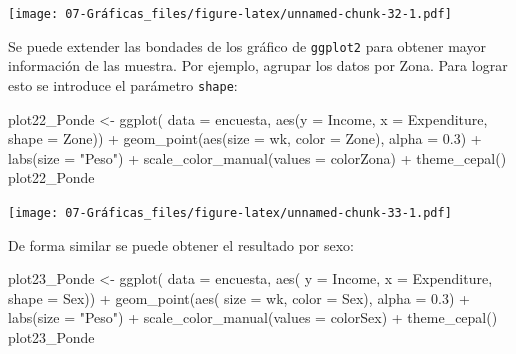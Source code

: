 \documentclass[
  12pt,
]{book}
\newenvironment{Shaded}{\begin{snugshade}}{\end{snugshade}}
\newcommand{\AttributeTok}[1]{\textcolor[rgb]{0.77,0.63,0.00}{#1}}
\newcommand{\FloatTok}[1]{\textcolor[rgb]{0.00,0.00,0.81}{#1}}
\newcommand{\FunctionTok}[1]{\textcolor[rgb]{0.00,0.00,0.00}{#1}}
\newcommand{\NormalTok}[1]{#1}
\newcommand{\OtherTok}[1]{\textcolor[rgb]{0.56,0.35,0.01}{#1}}
\newcommand{\SpecialCharTok}[1]{\textcolor[rgb]{0.00,0.00,0.00}{#1}}
\newcommand{\StringTok}[1]{\textcolor[rgb]{0.31,0.60,0.02}{#1}}
\begin{document}
\texttt{[image: 07-Gráficas\_files/figure-latex/unnamed-chunk-32-1.pdf]}

Se puede extender las bondades de los gráfico de \texttt{ggplot2} para obtener mayor información de las muestra. Por ejemplo, agrupar los datos por Zona. Para lograr esto se introduce el parámetro \texttt{shape}:

\begin{Shaded}
\begin{Highlighting}[]
\NormalTok{plot22\_Ponde }\OtherTok{\textless{}{-}} \FunctionTok{ggplot}\NormalTok{(}
  \AttributeTok{data =}\NormalTok{ encuesta,}
    \FunctionTok{aes}\NormalTok{(}\AttributeTok{y =}\NormalTok{ Income, }
        \AttributeTok{x =}\NormalTok{ Expenditure,}
        \AttributeTok{shape =}\NormalTok{ Zone)) }\SpecialCharTok{+} 
  \FunctionTok{geom\_point}\NormalTok{(}\FunctionTok{aes}\NormalTok{(}\AttributeTok{size =}\NormalTok{ wk, }\AttributeTok{color =}\NormalTok{ Zone), }\AttributeTok{alpha =} \FloatTok{0.3}\NormalTok{) }\SpecialCharTok{+}
  \FunctionTok{labs}\NormalTok{(}\AttributeTok{size =} \StringTok{"Peso"}\NormalTok{) }\SpecialCharTok{+} \FunctionTok{scale\_color\_manual}\NormalTok{(}\AttributeTok{values =}\NormalTok{ colorZona) }\SpecialCharTok{+}
  \FunctionTok{theme\_cepal}\NormalTok{()}
\NormalTok{plot22\_Ponde}
\end{Highlighting}
\end{Shaded}

\texttt{[image: 07-Gráficas\_files/figure-latex/unnamed-chunk-33-1.pdf]}

De forma similar se puede obtener el resultado por sexo:

\begin{Shaded}
\begin{Highlighting}[]
\NormalTok{plot23\_Ponde }\OtherTok{\textless{}{-}} \FunctionTok{ggplot}\NormalTok{(}
  \AttributeTok{data =}\NormalTok{ encuesta,}
    \FunctionTok{aes}\NormalTok{(}
      \AttributeTok{y =}\NormalTok{ Income,}
      \AttributeTok{x =}\NormalTok{ Expenditure,}
      \AttributeTok{shape =}\NormalTok{ Sex)) }\SpecialCharTok{+}
  \FunctionTok{geom\_point}\NormalTok{(}\FunctionTok{aes}\NormalTok{(}
    \AttributeTok{size =}\NormalTok{ wk,}
    \AttributeTok{color =}\NormalTok{ Sex),}
  \AttributeTok{alpha =} \FloatTok{0.3}\NormalTok{) }\SpecialCharTok{+}
  \FunctionTok{labs}\NormalTok{(}\AttributeTok{size =} \StringTok{"Peso"}\NormalTok{) }\SpecialCharTok{+}
  \FunctionTok{scale\_color\_manual}\NormalTok{(}\AttributeTok{values =}\NormalTok{ colorSex) }\SpecialCharTok{+}
  \FunctionTok{theme\_cepal}\NormalTok{()}
\NormalTok{plot23\_Ponde}
\end{Highlighting}
\end{Shaded}
\end{document}

